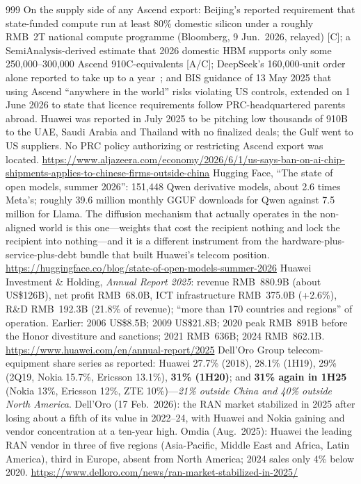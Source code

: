 \begin{thebibliography}{999}
 On the supply side of any Ascend export: Beijing's reported requirement that state-funded compute run at least 80\% domestic silicon under a roughly RMB~2T national compute programme (Bloomberg, 9 Jun.\ 2026, relayed) [C]; a SemiAnalysis-derived estimate that 2026 domestic HBM supports only some 250{,}000--300{,}000 Ascend 910C-equivalents [A/C]; DeepSeek's 160{,}000-unit order alone reported to take up to a year~\cite{deepseek-ascend-order}; and BIS guidance of 13 May 2025 that using Ascend ``anywhere in the world'' risks violating US controls, extended on 1 June 2026 to state that licence requirements follow PRC-headquartered parents abroad. Huawei was reported in July 2025 to be pitching low thousands of 910B to the UAE, Saudi Arabia and Thailand with no finalized deals; the Gulf went to US suppliers. No PRC policy authorizing or restricting Ascend export was located. \url{https://www.aljazeera.com/economy/2026/6/1/us-says-ban-on-ai-chip-shipments-applies-to-chinese-firms-outside-china}
 Hugging Face, ``The state of open models, summer 2026'': 151{,}448 Qwen derivative models, about 2.6 times Meta's; roughly 39.6 million monthly GGUF downloads for Qwen against 7.5 million for Llama. The diffusion mechanism that actually operates in the non-aligned world is this one---weights that cost the recipient nothing and lock the recipient into nothing---and it is a different instrument from the hardware-plus-service-plus-debt bundle that built Huawei's telecom position. \url{https://huggingface.co/blog/state-of-open-models-summer-2026}
 Huawei Investment \& Holding, \emph{Annual Report 2025}: revenue RMB~880.9B (about US\$126B), net profit RMB~68.0B, ICT infrastructure RMB~375.0B (+2.6\%), R\&D RMB~192.3B (21.8\% of revenue); ``more than 170 countries and regions'' of operation. Earlier: 2006 US\$8.5B; 2009 US\$21.8B; 2020 peak RMB~891B before the Honor divestiture and sanctions; 2021 RMB~636B; 2024 RMB~862.1B. \url{https://www.huawei.com/en/annual-report/2025}
 Dell'Oro Group telecom-equipment share series as reported: Huawei 27.7\% (2018), 28.1\% (1H19), 29\% (2Q19, Nokia 15.7\%, Ericsson 13.1\%), \textbf{31\% (1H20)}; and \textbf{31\% again in 1H25} (Nokia 13\%, Ericsson 12\%, ZTE 10\%)---\emph{21\% outside China and 40\% outside North America}. Dell'Oro (17 Feb.\ 2026): the RAN market stabilized in 2025 after losing about a fifth of its value in 2022--24, with Huawei and Nokia gaining and vendor concentration at a ten-year high. Omdia (Aug.\ 2025): Huawei the leading RAN vendor in three of five regions (Asia-Pacific, Middle East and Africa, Latin America), third in Europe, absent from North America; 2024 sales only 4\% below 2020. \url{https://www.delloro.com/news/ran-market-stabilized-in-2025/}

\end{thebibliography}
